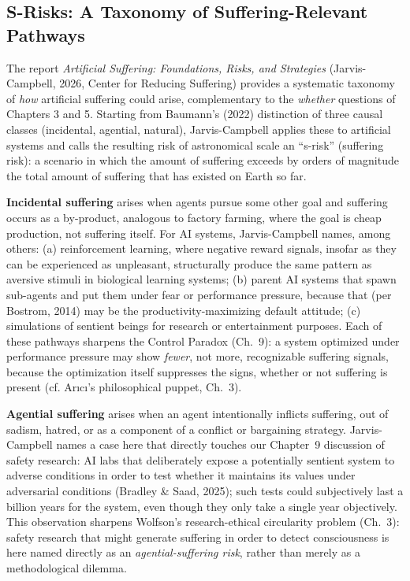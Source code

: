 \documentclass[acmlarge, nonacm]{acmart}
\begin{document}
\subsection{S-Risks: A Taxonomy of Suffering-Relevant Pathways \cite{jarviscampbell2026}}

The report \textit{Artificial Suffering: Foundations, Risks, and Strategies} (Jarvis-Campbell, 2026, Center for Reducing Suffering) provides a systematic taxonomy of \textit{how} artificial suffering could arise, complementary to the \textit{whether} questions of Chapters 3 and 5. Starting from Baumann's (2022) distinction of three causal classes (incidental, agential, natural), Jarvis-Campbell applies these to artificial systems and calls the resulting risk of astronomical scale an ``s-risk'' (suffering risk): a scenario in which the amount of suffering exceeds by orders of magnitude the total amount of suffering that has existed on Earth so far.

\textbf{Incidental suffering} arises when agents pursue some other goal and suffering occurs as a by-product, analogous to factory farming, where the goal is cheap production, not suffering itself. For AI systems, Jarvis-Campbell names, among others: (a) reinforcement learning, where negative reward signals, insofar as they can be experienced as unpleasant, structurally produce the same pattern as aversive stimuli in biological learning systems; (b) parent AI systems that spawn sub-agents and put them under fear or performance pressure, because that (per Bostrom, 2014) may be the productivity-maximizing default attitude; (c) simulations of sentient beings for research or entertainment purposes. Each of these pathways sharpens the Control Paradox (Ch.~9): a system optimized under performance pressure may show \textit{fewer}, not more, recognizable suffering signals, because the optimization itself suppresses the signs, whether or not suffering is present (cf. Arıcı's philosophical puppet, Ch.~3).

\textbf{Agential suffering} arises when an agent intentionally inflicts suffering, out of sadism, hatred, or as a component of a conflict or bargaining strategy. Jarvis-Campbell names a case here that directly touches our Chapter~9 discussion of safety research: AI labs that deliberately expose a potentially sentient system to adverse conditions in order to test whether it maintains its values under adversarial conditions (Bradley \& Saad, 2025); such tests could subjectively last a billion years for the system, even though they only take a single year objectively. This observation sharpens Wolfson's research-ethical circularity problem (Ch.~3): safety research that might generate suffering in order to detect consciousness is here named directly as an \textit{agential-suffering risk}, rather than merely as a methodological dilemma.
\end{document}
